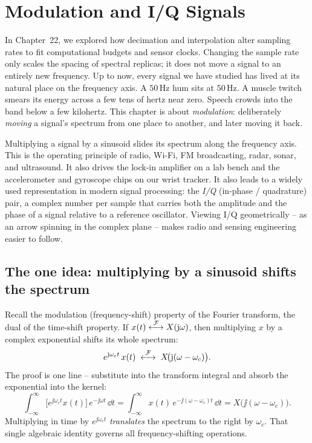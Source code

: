 \chapter{Modulation and I/Q Signals}

In Chapter~22, we explored how decimation and interpolation alter sampling rates to fit
computational budgets and sensor clocks. Changing the sample rate only scales the spacing
of spectral replicas; it does not move a signal to an entirely new frequency. Up to now,
every signal we have studied has lived at its natural place on the
frequency axis. A $50\,$Hz hum sits at $50\,$Hz. A muscle twitch smears its energy
across a few tens of hertz near zero. Speech crowds into the band below a few
kilohertz. This chapter is about \emph{modulation}: deliberately \emph{moving} a
signal's spectrum from one place to another, and later moving it back.

Multiplying a signal by a sinusoid slides its spectrum along the frequency axis. This is the
operating principle of radio, Wi-Fi, FM broadcasting, radar,
sonar, and ultrasound. It also drives the lock-in amplifier on a lab bench and
the accelerometer and gyroscope chips on our wrist tracker. It
also leads to a widely used representation in modern signal
processing: the \emph{I/Q} (in-phase / quadrature) pair, a complex number per sample
that carries both the amplitude and the phase of a signal relative to a reference
oscillator. Viewing I/Q geometrically -- as an arrow spinning in the
complex plane -- makes radio and sensing
engineering easier to follow.

\section{The one idea: multiplying by a sinusoid shifts the spectrum}
\label{ch23:mod-property}

Recall the modulation (frequency-shift) property of the Fourier transform, the dual of
the time-shift property. If $x(t) \overset{\mathcal{F}}{\longleftrightarrow} X(\mathrm{j}\omega)$, then
multiplying $x$ by a complex exponential shifts its whole spectrum:
\begin{equation}
\label{ch23:expshift}
e^{\mathrm{j}\omega_c t}\, x(t)
\;\overset{\mathcal{F}}{\longleftrightarrow}\;
X\!\big(\mathrm{j}(\omega-\omega_c)\big).
\end{equation}
The proof is one line -- substitute into the transform integral and absorb the
exponential into the kernel:
\begin{equation}
\int_{-\infty}^{\infty} \big[e^{\jj\omega_c t}x(t)\big]\,e^{-\jj\omega t}\,\dd t
= \int_{-\infty}^{\infty} x(t)\,e^{-\jj(\omega-\omega_c)t}\,\dd t
= X\!\big(\jj(\omega-\omega_c)\big).
\end{equation}
Multiplying in time by $e^{\jj\omega_c t}$ \emph{translates} the spectrum to the right
by $\omega_c$. That single algebraic identity governs all frequency-shifting operations.

